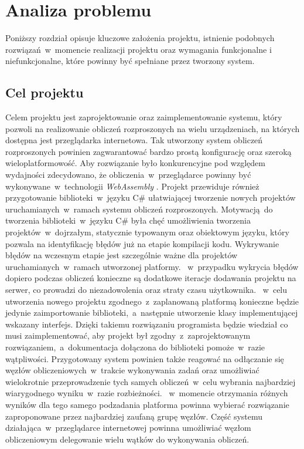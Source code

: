 \documentclass[a4paper,11pt,twoside]{report}
\theoremstyle{definition}
\begin{document}
\chapter{Analiza problemu}
    \label{analiza-problemu}

    Poniższy rozdział opisuje kluczowe założenia projektu, istnienie podobnych rozwiązań~w~momencie realizacji projektu oraz wymagania funkcjonalne i niefunkcjonalne, które powinny być spełniane przez tworzony system.

    \section{Cel projektu}
        Celem projektu jest zaprojektowanie oraz zaimplementowanie systemu, który pozwoli na realizowanie obliczeń rozproszonych na wielu urządzeniach, na których dostępna jest przeglądarka internetowa.
        Tak utworzony system obliczeń rozproszonych powinien zagwarantować bardzo prostą konfigurację oraz szeroką wieloplatformowość.
        Aby rozwiązanie było konkurencyjne pod względem wydajności zdecydowano, że obliczenia~w~przeglądarce powinny być wykonywane~w~technologii \textit{WebAssembly} \cite{webassembly}.
        Projekt przewiduje również przygotowanie biblioteki~w~języku C\# ułatwiającej tworzenie nowych projektów uruchamianych~w~ramach systemu obliczeń rozproszonych. 
        Motywacją do tworzenia biblioteki~w~języku C\# była chęć umożliwienia tworzenia projektów~w~dojrzałym, statycznie typowanym oraz obiektowym języku, który pozwala na identyfikację błędów już na etapie kompilacji kodu. 
        Wykrywanie błędów na wczesnym etapie jest szczególnie ważne dla projektów uruchamianych~w~ramach utworzonej platformy.
       ~w~przypadku wykrycia błędów dopiero podczas obliczeń konieczne są dodatkowe iteracje dodawania projektu na serwer, co prowadzi do niezadowolenia oraz straty czasu użytkownika.
       ~w~celu utworzenia nowego projektu zgodnego~z~zaplanowaną platformą konieczne będzie jedynie zaimportowanie biblioteki,~a~następnie utworzenie klasy implementującej wskazany interfejs.
        Dzięki takiemu rozwiązaniu programista będzie wiedział co musi zaimplementować, aby projekt był zgodny~z~zaprojektowanym rozwiązaniem,~a~dokumentacja dołączona do biblioteki pomoże~w~razie wątpliwości.
        Przygotowany system powinien także reagować na odłączanie się węzłów obliczeniowych~w~trakcie wykonywania zadań oraz umożliwiać wielokrotnie przeprowadzenie tych samych obliczeń~w~celu wybrania najbardziej wiarygodnego wyniku~w~razie rozbieżności.
       ~w~momencie otrzymania różnych wyników dla tego samego podzadania platforma powinna wybierać rozwiązanie zaproponowane przez najbardziej zaufaną grupę węzłów.
        Część systemu działająca~w~przeglądarce internetowej powinna umożliwiać węzłom obliczeniowym delegowanie wielu wątków do wykonywania obliczeń.
    
\end{document}
